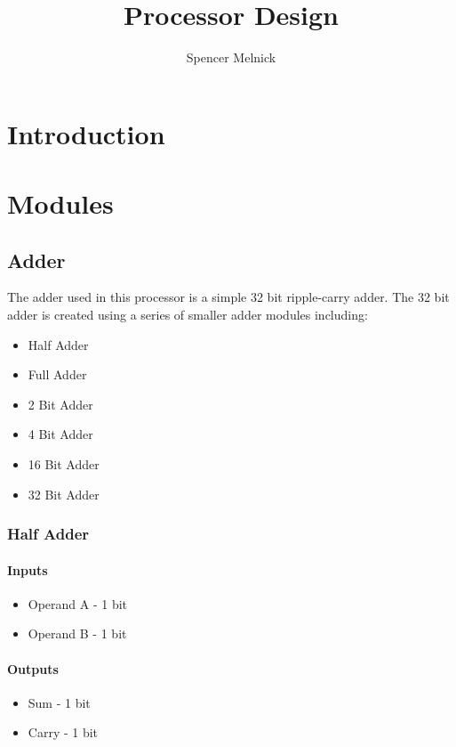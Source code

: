 \documentclass{article}
\begin{document}
    \title{Processor Design}
    \author{Spencer Melnick}

    \maketitle

    \section{Introduction}

    \section{Modules}

    \subsection{Adder}

    The adder used in this processor is a simple 32 bit ripple-carry adder.
    The 32 bit adder is created using a series of smaller adder modules
    including:
    
    \begin{itemize}
        \item Half Adder
        \item Full Adder
        \item 2 Bit Adder
        \item 4 Bit Adder
        \item 16 Bit Adder
        \item 32 Bit Adder
    \end{itemize}




    \subsubsection{Half Adder}

    \paragraph{Inputs}
    \begin{itemize}
        \item Operand A - 1 bit
        \item Operand B - 1 bit
    \end{itemize}

    \paragraph{Outputs}
    \begin{itemize}
        \item Sum - 1 bit
        \item Carry - 1 bit
    \end{itemize}
\end{document}
